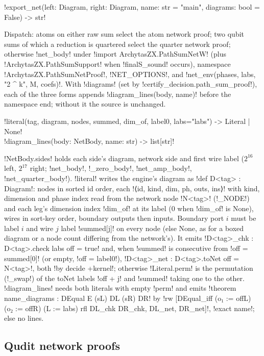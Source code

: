 {{{\begin{signature}
\lexpy!export_net(left: Diagram, right: Diagram, name: str = "main", diagrams: bool = False) -> str!
\end{signature}
Dispatch: atoms on either raw sum select the atom network proof; two qubit sums of which a
reduction is quartered select the quarter network proof; otherwise \lexpy!net_body! under
\lexlean!import ArchytasZX.PathSumNetW! (plus \lexlean!ArchytasZX.PathSumSupport! when
\lexlean!finalS_sound! occurs), namespace \lexlean!ArchytasZX.PathSumNetProof!, \lexpy!NET_OPTIONS!, and
\lexpy!net_env(phases, labs, "2 ^ k", M, coefs)!. With \py!diagrams! (set by
\py!certify_decision.path_sum_proof!), each of the three forms appends \py!diagram_lines(body, name)!
before the namespace end; without it the source is unchanged.

\begin{signature}
\lexpy!literal(tag, diagram, nodes, summed, dim_of, label0, labs="labs") -> Literal | None!\\
\lexpy!diagram_lines(body: NetBody, name: str) -> list[str]!
\end{signature}
\py!NetBody.sides! holds each side's diagram, network side and first wire label ($2^{16}$ left,
$2^{17}$ right; \py!net_body!, \py!_zero_body!, \py!net_amp_body!, \py!net_quarter_body!).
\py!literal! writes the engine's diagram as \lexlean!def D<tag> : Diagram!: nodes in sorted id order,
each \lexlean!⟨id, kind, dim, ph, outs, ins⟩! with kind, dimension and phase index read from the
network node \lexlean!N<tag>! (\py!_NODE!) and each leg's dimension index \py!dim_of! at its label (0
when \py!dim_of! is None), wires in sort-key order, boundary outputs then inputs. Boundary port $i$
must be label $i$ and wire $j$ label \py!summed[j]! on every node (else None, as for a boxed diagram
or a node count differing from the network's). It emits \lexlean!D<tag>_chk : D<tag>.check labs off = true!
and, when \py!summed! is consecutive from \py!off = summed[0]! (or empty, \py!off = label0!),
\lexlean!D<tag>_net : D<tag>.toNet off = N<tag>!, both \lexlean!by decide +kernel!; otherwise
\py!Literal.perm! is the permutation (\py!_swap!) of the toNet labels \py!off + j! and \py!summed!
taking one to the other. \py!diagram_lines! needs both literals with empty \py!perm! and emits
\lexlean!theorem name_diagrams : DEqual E (sL) DL (sR) DR! by
\lexlean!rw [DEqual_iff (o₁ := offL) (o₂ := offR) (L := labs) rfl DL_chk DR_chk, DL_net, DR_net]!,
\lexlean!exact name!; else no lines.

\subsection{Qudit network proofs}

}}}
